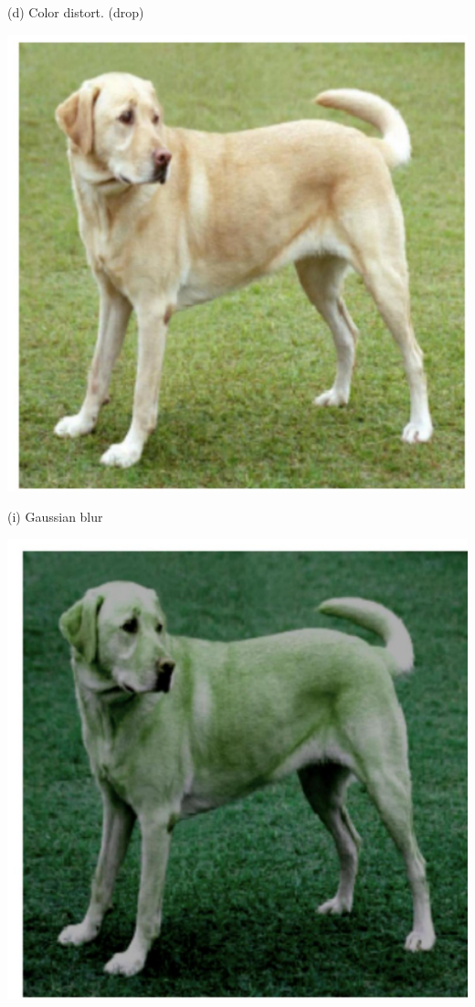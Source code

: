 \documentclass[10pt]{article}
\begin{document}
(d) Color distort. (drop)

\begin{center}
\includegraphics[max width=\textwidth]{2024_01_08_959e2db67a31f073f6d2g-24(5)}
\end{center}

(i) Gaussian blur

\begin{center}
\includegraphics[max width=\textwidth]{2024_01_08_959e2db67a31f073f6d2g-24(7)}
\end{center}
\end{document}
